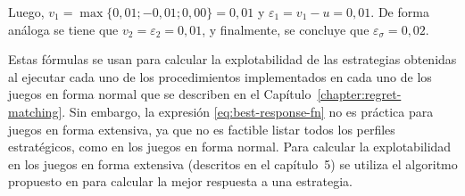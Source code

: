 Luego, $v_1 = \max\{0,01; -0,01; 0,00\} = 0,01$ y $\varepsilon_1 = v_1 - u = 0,01$. De forma análoga se tiene que $v_2 = \varepsilon_2 = 0,01$, y finalmente, se concluye que $\varepsilon_{\sigma} = 0,02$.

Estas fórmulas se usan para calcular la explotabilidad de las estrategias obtenidas al ejecutar cada uno de los procedimientos implementados en cada uno de los juegos en forma normal que se describen en el Capítulo~\ref{chapter:regret-matching}. Sin embargo, la expresión \ref{eq:best-response-fn} no es práctica para juegos en forma extensiva, ya que no es factible listar todos los perfiles estratégicos, como en los juegos en forma normal. Para calcular la explotabilidad en los juegos en forma extensiva (descritos en el capítulo~5) se utiliza el algoritmo propuesto en \cite{bib:thesis-marc-lanctot} para calcular la mejor respuesta a una estrategia. 
